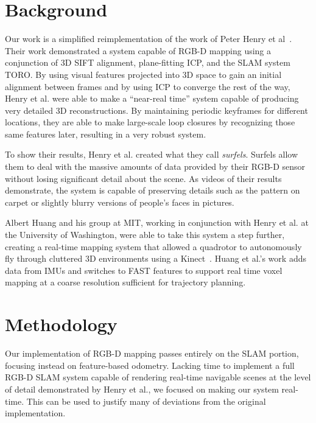 \documentclass[letterpaper, 10pt, conference]{ieeeconf}
\begin{document}
\section{Background}
Our work is a simplified reimplementation of the work of Peter Henry et
al~\cite{Henry2010rgbd}. Their work demonstrated a system capable of RGB-D
mapping using a conjunction of 3D SIFT alignment, plane-fitting ICP, and the
SLAM system TORO. By using visual features projected into 3D space to gain an
initial alignment between frames and by using ICP to converge the rest of the
way, Henry et al. were able to make a ``near-real time'' system capable of
producing very detailed 3D reconstructions. By maintaining periodic keyframes
for different locations, they are able to make large-scale loop closures by
recognizing those same features later, resulting in a very robust system.

To show their results, Henry et al. created what they call \emph{surfels}.
Surfels allow them to deal with the massive amounts of data provided by their
RGB-D sensor without losing significant detail about the scene. As videos of
their results demonstrate, the system is capable of preserving details such as
the pattern on carpet or slightly blurry versions of people's faces in
pictures.

Albert Huang and his group at MIT, working in conjunction with Henry et al. at
the University of Washington, were able to take this system a step further,
creating a real-time mapping system that allowed a quadrotor to autonomously
fly through cluttered 3D environments using a Kinect~\cite{Huang2011isrr}.
Huang et al.'s work adds data from IMUs and switches to FAST features to
support real time voxel mapping at a coarse resolution sufficient for
trajectory planning.

\section{Methodology}
Our implementation of RGB-D mapping passes entirely on the SLAM portion,
focusing instead on feature-based odometry. Lacking time to implement a
full RGB-D SLAM system capable of rendering real-time navigable scenes at the
level of detail demonstrated by Henry et al., we focused on making our system
real-time. This can be used to justify many of deviations from the original
implementation.
\end{document}
